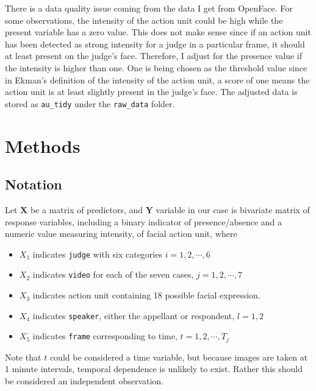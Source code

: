 \documentclass{monashthesis}
\begin{document}
There is a data quality issue coming from the data I get from OpenFace. For some observations, the intensity of the action unit could be high while the present variable has a zero value. This does not make sense since if an action unit has been detected as strong intensity for a judge in a particular frame, it should at least present on the judge's face. Therefore, I adjust for the presence value if the intensity is higher than one. One is being chosen as the threshold value since in Ekman's definition of the intensity of the action unit, a score of one means the action unit is at least slightly present in the judge's face. The adjusted data is stored as \texttt{au\_tidy} under the \texttt{raw\_data} folder.

\hypertarget{methods}{%
\chapter{Methods}\label{methods}}

\hypertarget{notation}{%
\section{Notation}\label{notation}}

Let \(\mathbf{X}\) be a matrix of predictors, and \(\mathbf{Y}\) variable in our case is bivariate matrix of response variables, including a binary indicator of presence/absence and a numeric value measuring intensity, of facial action unit, where

\begin{itemize}
\item
  \(X_1\) indicates \texttt{judge} with six categories \(i = 1,2, \cdots, 6\)
\item
  \(X_2\) indicates \texttt{video} for each of the seven cases, \(j = 1,2, \cdots, 7\)
\item
  \(X_3\) indicates action unit containing 18 possible facial expression.
\item
  \(X_4\) indicates \texttt{speaker}, either the appellant or respondent, \(l=1,2\)
\item
  \(X_5\) indicates \texttt{frame} corresponding to time, \(t = 1,2, \cdots, T_j\)
\end{itemize}

Note that \(t\) could be considered a time variable, but because images are taken at 1 minute intervals, temporal dependence is unlikely to exist. Rather this should be considered an independent observation.
\end{document}
